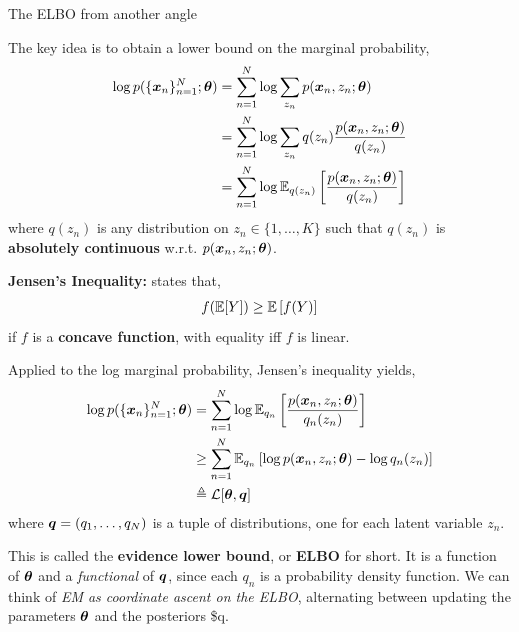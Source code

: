 \documentclass[aspectratio=169]{beamer}
\begin{document}
\begin{frame}[t, allowframebreaks]{The ELBO from another angle}\label{evidence-lower-bound-elbo}

The key idea is to obtain a lower bound on the marginal probability,
\begin{align*}
    \log p(\{\boldsymbol{x}_n\}_{n=1}^N; \boldsymbol{\theta}) 
    &= \sum_{n=1}^N  \log \sum_{z_n} p(\boldsymbol{x}_n, z_n; \boldsymbol{\theta}) \\
    &= \sum_{n=1}^N  \log \sum_{z_n} q(z_n) \frac{p(\boldsymbol{x}_n, z_n; \boldsymbol{\theta})}{q(z_n)} \\
    &= \sum_{n=1}^N  \log \mathbb{E}_{q(z_n)} \left[\frac{p(\boldsymbol{x}_n, z_n; \boldsymbol{\theta})}{q(z_n)} \right]
\end{align*} where \(q(z_n)\) is any distribution on
\(z_n \in \{1,\ldots,K\}\) such that \(q(z_n)\) is \textbf{absolutely
continuous} w.r.t. \(p(\boldsymbol{x}_n, z_n; \boldsymbol{\theta})\).

\textbf{Jensen's Inequality:} states that, 
\begin{align*}
    f(\mathbb{E}[Y]) \geq \mathbb{E}\left[ f(Y) \right]
\end{align*} if \(f\) is a \textbf{concave function}, with equality iff
\(f\) is linear.

Applied to the log marginal probability, Jensen's inequality yields,
\begin{align*}
    \log p(\{\boldsymbol{x}_n\}_{n=1}^N; \boldsymbol{\theta}) 
    &= \sum_{n=1}^N  \log \mathbb{E}_{q_n} \left[\frac{p(\boldsymbol{x}_n, z_n; \boldsymbol{\theta})}{q_n(z_n)} \right] \\
    &\geq \sum_{n=1}^N  \mathbb{E}_{q_n} \left[\log p(\boldsymbol{x}_n, z_n; \boldsymbol{\theta}) - \log q_n(z_n) \right] \\
    &\triangleq \mathcal{L}[\boldsymbol{\theta}, \boldsymbol{q}]
\end{align*} where \(\boldsymbol{q} = (q_1, \ldots, q_N)\) is a tuple of
distributions, one for each latent variable \(z_n\).

This is called the \textbf{evidence lower bound}, or \textbf{ELBO} for
short. It is a function of \(\boldsymbol{\theta}\) and a \emph{functional} of
\(\boldsymbol{q}\), since each \(q_n\) is a probability density function. We can
think of \emph{EM as coordinate ascent on the ELBO}, alternating between
updating the parameters \(\boldsymbol{\theta}\) and the posteriors \$q.
\end{frame}
\end{document}
